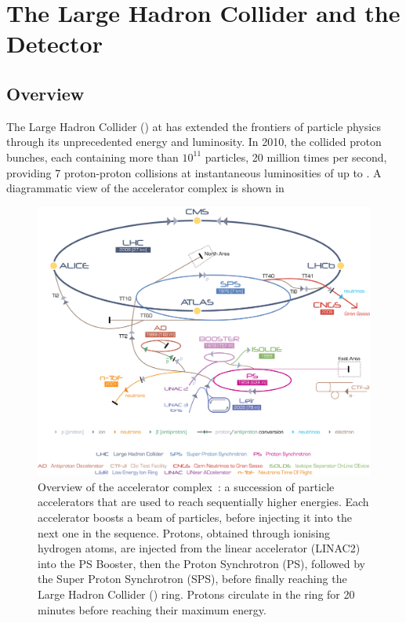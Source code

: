 \chapter{The Large Hadron Collider and the \ATLAS Detector}
\label{chap:detector}


\section{Overview}
The Large Hadron Collider (\LHC) at \CERN has extended the frontiers of particle physics through its unprecedented energy and luminosity.
In 2010, the \LHC collided proton bunches, each containing more than $10^{11}$ particles, 20 million times per second, providing \unit{7}{\TeV} proton-proton collisions at instantaneous luminosities of up to \peakLumi.
A diagrammatic view of the \CERN accelerator complex is shown in 

\begin{figure}[htpb]
  \includegraphics[width=\hugefigwidth]{chapters/detector/cernaccelerators.jpg}
  \caption{Overview of the \CERN accelerator complex~\cite{CERN:2012:accelerators}: a succession of particle accelerators that are used to reach sequentially higher energies. Each accelerator boosts a beam of particles, before injecting it into the next one in the sequence. Protons, obtained through ionising hydrogen atoms, are injected from the linear accelerator (LINAC2) into the PS Booster, then the Proton Synchrotron (PS), followed by the Super Proton Synchrotron (SPS), before finally reaching the Large Hadron Collider (\LHC) ring. Protons circulate in the \LHC ring for 20 minutes before reaching their maximum energy.}
  \label{fig:detector:cern_accelerators}
\end{figure}

